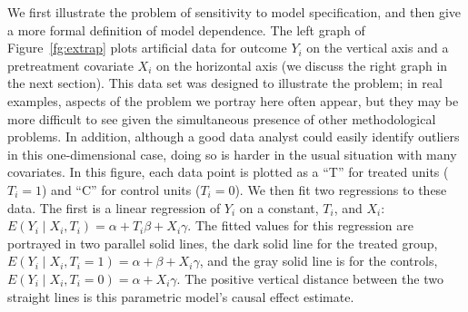 \documentclass[11pt,titlepage]{article}
\begin{document}
We first illustrate the problem of sensitivity to model specification,
and then give a more formal definition of model dependence.  The left
graph of Figure~\ref{fg:extrap} plots artificial data for outcome
$Y_i$ on the vertical axis and a pretreatment covariate $X_i$ on the
horizontal axis (we discuss the right graph in the next section).
This data set was designed to illustrate the problem; in real
examples, aspects of the problem we portray here often appear, but
they may be more difficult to see given the simultaneous presence of
other methodological problems.  In addition, although a good data
analyst could easily identify outliers in this one-dimensional case,
doing so is harder in the usual situation with many covariates.  In
this figure, each data point is plotted as a ``T'' for treated units
($T_i=1$) and ``C'' for control units ($T_i=0$).  We then fit two
regressions to these data.  The first is a linear regression of $Y_i$
on a constant, $T_i$, and $X_i$: $E(Y_i\mid X_i,T_i)=\alpha + T_i\beta
+ X_i\gamma$.  The fitted values for this regression are portrayed in
two parallel solid lines, the dark solid line for the treated group,
$E(Y_i\mid X_i, T_i=1)=\alpha+\beta+X_i\gamma$, and the gray solid
line is for the controls, $E(Y_i\mid X_i,T_i=0)=\alpha+X_i\gamma$.
The positive vertical distance between the two straight lines is this
parametric model's causal effect estimate.
\end{document}
